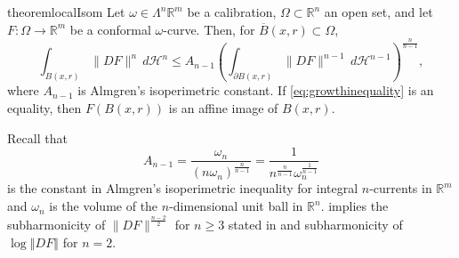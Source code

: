\documentclass[a4paper,leqno,11pt]{amsart}
\numberwithin{equation}{section}
\theoremstyle{remark}
\theoremstyle{remark}
\newcommand{\R}{\mathbb{R}}
\newcommand{\norm}[1]{ \left\Vert #1 \right\Vert }	%
\begin{document}
%
\begin{restatable}{theorem}{localIsom}
\label{thm:isoperimetric-inequality}
Let $\omega \in \Lambda^n \R^m$ be a calibration, $\Omega\subset \R^n$ an open set, and let $F \colon \Omega \to \R^m$ be a conformal $\omega$-curve. Then, for $\overline{B}(x,r) \subset \Omega$,
\begin{equation}
\label{eq:growthinequality}
    \int_{ B( x, r ) }
        \|DF\|^n
    \,d\mathcal{H}^n
    \leq
    A_{n-1}
    \left(
        \int_{ \partial B(x,r) } \|DF\|^{n-1} \,d\mathcal{H}^{n-1}
    \right)^{ \frac{n}{n-1} },
\end{equation}
where $A_{n-1}$ is Almgren's isoperimetric constant. If \eqref{eq:growthinequality} is an equality, then $F( B(x,r) )$ is an affine image of $B(x,r)$.
\end{restatable}
Recall that 
\begin{equation*}
    A_{n-1}
    =
    \frac{ \omega_n }{ ( n \omega_n )^{ \frac{n}{n-1} } }
    =
    \frac{1}{ n^{ \frac{n}{n-1} } \omega_n^{ \frac{1}{n-1} } }
\end{equation*}
is the constant in Almgren's isoperimetric inequality \cite{Alm:86} for integral $n$-currents in $\mathbb{R}^m$ and $\omega_{n}$ is the volume of the $n$-dimensional unit ball in $\R^n$.  implies the subharmonicity of $\|DF\|^{ \frac{n-2}{2} }$ for $n\ge 3$ stated in  and subharmonicity of $\log \norm{DF}$ for $n=2$.
\end{document}
